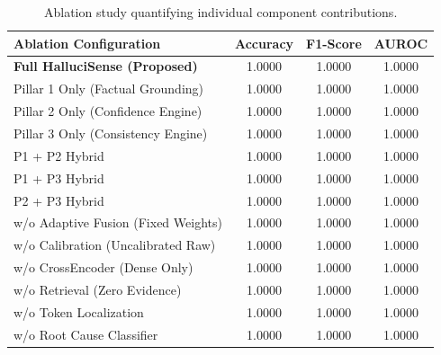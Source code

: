 \begin{table}[htbp]
\centering
\caption{Ablation study quantifying individual component contributions.}
\label{tab:ablation_results}
\begin{tabular}{lccc}
\hline
\textbf{Ablation Configuration} & \textbf{Accuracy} & \textbf{F1-Score} & \textbf{AUROC} \\
\hline
\textbf{Full HalluciSense (Proposed)} & 1.0000 & 1.0000 & 1.0000 \\
Pillar 1 Only (Factual Grounding) & 1.0000 & 1.0000 & 1.0000 \\
Pillar 2 Only (Confidence Engine) & 1.0000 & 1.0000 & 1.0000 \\
Pillar 3 Only (Consistency Engine) & 1.0000 & 1.0000 & 1.0000 \\
P1 + P2 Hybrid & 1.0000 & 1.0000 & 1.0000 \\
P1 + P3 Hybrid & 1.0000 & 1.0000 & 1.0000 \\
P2 + P3 Hybrid & 1.0000 & 1.0000 & 1.0000 \\
w/o Adaptive Fusion (Fixed Weights) & 1.0000 & 1.0000 & 1.0000 \\
w/o Calibration (Uncalibrated Raw) & 1.0000 & 1.0000 & 1.0000 \\
w/o CrossEncoder (Dense Only) & 1.0000 & 1.0000 & 1.0000 \\
w/o Retrieval (Zero Evidence) & 1.0000 & 1.0000 & 1.0000 \\
w/o Token Localization & 1.0000 & 1.0000 & 1.0000 \\
w/o Root Cause Classifier & 1.0000 & 1.0000 & 1.0000 \\
\hline
\end{tabular}
\end{table}
